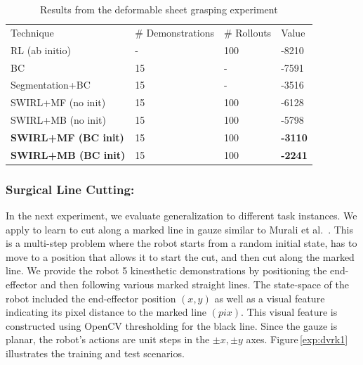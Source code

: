 \begin{table}[]
\centering
\scriptsize
\caption{Results from the deformable sheet grasping experiment}
\label{my-label}
\begin{tabular}{llll}
\rowcolor[HTML]{000000} 
{\color[HTML]{FFFFFF} Technique} & {\color[HTML]{FFFFFF} \# Demonstrations} & {\color[HTML]{FFFFFF} \# Rollouts} & {\color[HTML]{FFFFFF} Value} \\
RL (ab initio)                   & -                                        & 100                                & -8210                        \\
BC                               & 15                                       & -                                  & -7591                        \\
Segmentation+BC                  & 15                                       & -                                  & -3516                        \\
SWIRL+MF (no init)                  & 15                                       & 100                                & -6128                        \\
SWIRL+MB (no init)                  & 15                                       & 100                                & -5798                        \\
\textbf{SWIRL+MF (BC init)}                  & 15                                       & 100                                & \textbf{-3110}     \\
\textbf{SWIRL+MB (BC init)}                  & 15                                       & 100                                & \textbf{-2241}                       
\end{tabular}
\end{table}

\subsubsection{Surgical Line Cutting: }
In the next experiment, we evaluate generalization to different task instances.
We apply \hirl to learn to cut along a marked line in gauze similar to Murali et al.~\cite{murali2015learning}.
This is a multi-step problem where the robot starts from a random initial state, has to move to a position that allows it to start the cut, and then cut along the marked line.
We provide the robot 5 kinesthetic demonstrations by positioning the end-effector and then following various marked straight lines.
The state-space of the robot included the end-effector position $(x,y)$ as well as a visual feature indicating its pixel distance to the marked line $(pix)$.
This visual feature is constructed using OpenCV thresholding for the black line.
Since the gauze is planar, the robot's actions are unit steps in the $\pm x, \pm y$ axes.
Figure\,\ref{exp:dvrk1} illustrates the training and test scenarios.

